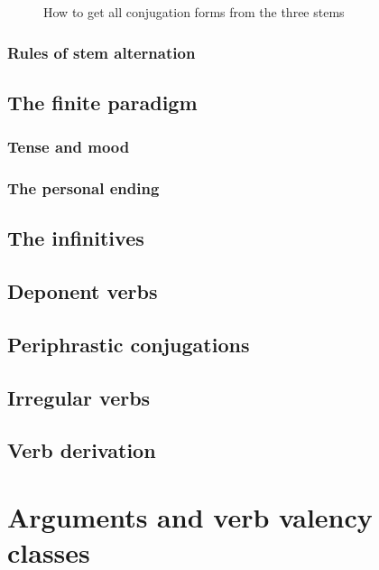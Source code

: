 \documentclass[UTF8, a4paper, oneside]{report}
\begin{document}
\begin{sidewaysfigure}
    \centering
    
    \caption{How to get all conjugation forms from the three stems}
    \label{fig:stem-to-form}
\end{sidewaysfigure}

\subsection{Rules of stem alternation}

\section{The finite paradigm}

\subsection{Tense and mood}\label{sec:tense-mood-marking}

\subsection{The personal ending}

\section{The infinitives}

\section{Deponent verbs}

\section{Periphrastic conjugations}

\section{Irregular verbs}

\section{Verb derivation}

\chapter{Arguments and verb valency classes}
\end{document}

